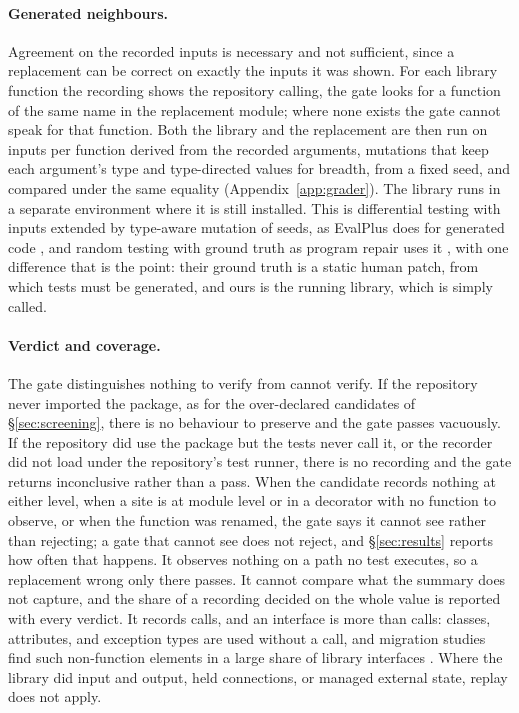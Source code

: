 \documentclass[11pt]{article}
\begin{document}
\paragraph{Generated neighbours.}
Agreement on the recorded inputs is necessary and not sufficient, since a replacement can be correct on exactly the inputs it was shown.
For each library function the recording shows the repository calling, the gate looks for a function of the same name in the replacement module; where none exists the gate cannot speak for that function.
Both the library and the replacement are then run on \nFuzzInputs{} inputs per function derived from the recorded arguments, mutations that keep each argument's type and type-directed values for breadth, from a fixed seed, and compared under the same equality (Appendix~\ref{app:grader}).
The library runs in a separate environment where it is still installed.
This is differential testing \citep{mckeeman1998differential} with inputs extended by type-aware mutation of seeds, as EvalPlus does for generated code \citep{liu2023evalplus}, and random testing with ground truth as program repair uses it \citep{ye2021rgt}, with one difference that is the point: their ground truth is a static human patch, from which tests must be generated, and ours is the running library, which is simply called.

\paragraph{Verdict and coverage.}
The gate distinguishes nothing to verify from cannot verify.
If the repository never imported the package, as for the over-declared candidates of \S\ref{sec:screening}, there is no behaviour to preserve and the gate passes vacuously.
If the repository did use the package but the tests never call it, or the recorder did not load under the repository's test runner, there is no recording and the gate returns inconclusive rather than a pass.
When the candidate records nothing at either level, when a site is at module level or in a decorator with no function to observe, or when the function was renamed, the gate says it cannot see rather than rejecting; a gate that cannot see does not reject, and \S\ref{sec:results} reports how often that happens.
It observes nothing on a path no test executes, so a replacement wrong only there passes.
It cannot compare what the summary does not capture, and the share of a recording decided on the whole value is reported with every verdict.
It records calls, and an interface is more than calls: classes, attributes, and exception types are used without a call, and migration studies find such non-function elements in a large share of library interfaces \citep{islam2023characterizing}.
Where the library did input and output, held connections, or managed external state, replay does not apply.
\end{document}
